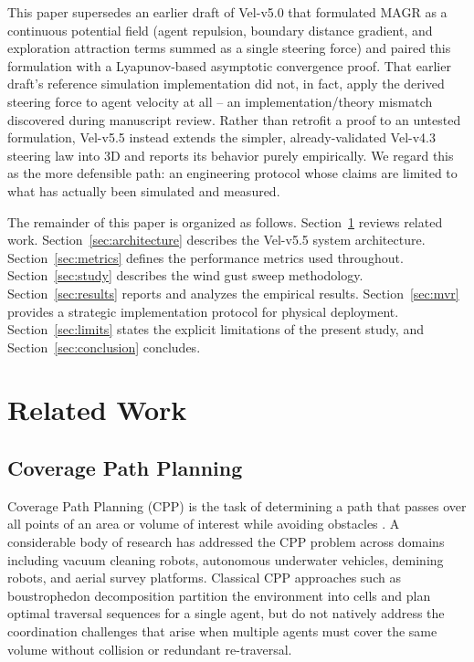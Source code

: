 \documentclass[10pt,journal]{IEEEtran}
\begin{document}
This paper supersedes an earlier draft of Vel-v5.0 that formulated MAGR as
a continuous potential field (agent repulsion, boundary distance gradient,
and exploration attraction terms summed as a single steering force) and
paired this formulation with a Lyapunov-based asymptotic convergence proof.
That earlier draft's reference simulation implementation did not, in fact,
apply the derived steering force to agent velocity at all -- an
implementation/theory mismatch discovered during manuscript review. Rather
than retrofit a proof to an untested formulation, Vel-v5.5 instead extends
the simpler, already-validated Vel-v4.3 steering law into 3D and reports
its behavior purely empirically. We regard this as the more defensible
path: an engineering protocol whose claims are limited to what has actually
been simulated and measured.

The remainder of this paper is organized as follows. Section~\ref{sec:related}
reviews related work. Section~\ref{sec:architecture} describes the Vel-v5.5
system architecture. Section~\ref{sec:metrics} defines the performance
metrics used throughout. Section~\ref{sec:study} describes the wind gust
sweep methodology. Section~\ref{sec:results} reports and analyzes the
empirical results. Section~\ref{sec:mvr} provides a strategic
implementation protocol for physical deployment. Section~\ref{sec:limits}
states the explicit limitations of the present study, and
Section~\ref{sec:conclusion} concludes.

\section{Related Work}
\label{sec:related}

\subsection{Coverage Path Planning}
Coverage Path Planning (CPP) is the task of determining a path that passes
over all points of an area or volume of interest while avoiding obstacles
\cite{yamauchi1997}. A considerable body of research has addressed the CPP
problem across domains including vacuum cleaning robots, autonomous
underwater vehicles, demining robots, and aerial survey platforms. Classical
CPP approaches such as boustrophedon decomposition partition the
environment into cells and plan optimal traversal sequences for a single
agent, but do not natively address the coordination challenges that arise
when multiple agents must cover the same volume without collision or
redundant re-traversal.
\end{document}
